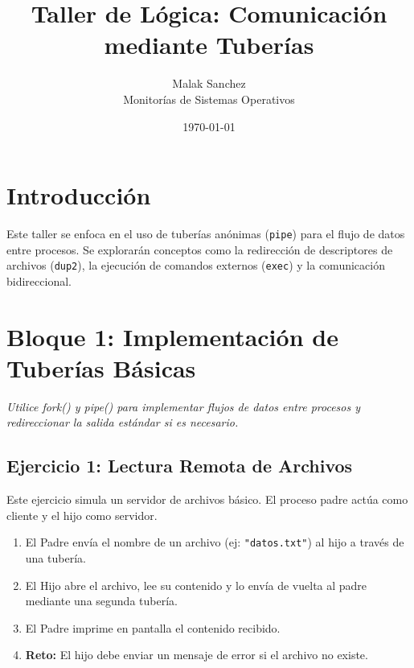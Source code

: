 \documentclass[12pt,a4paper]{article}
\title{\textbf{Taller de Lógica: Comunicación mediante Tuberías}}
\author{Malak Sanchez \\ \small Monitorías de Sistemas Operativos}
\date{\today}
\begin{document}
\maketitle

\section*{Introducción}
Este taller se enfoca en el uso de tuberías anónimas (\texttt{pipe}) para el flujo de datos entre procesos. Se explorarán conceptos como la redirección de descriptores de archivos (\texttt{dup2}), la ejecución de comandos externos (\texttt{exec}) y la comunicación bidireccional.

\section*{Bloque 1: Implementación de Tuberías Básicas}
\textit{Utilice fork() y pipe() para implementar flujos de datos entre procesos y redireccionar la salida estándar si es necesario.}

\subsection*{Ejercicio 1: Lectura Remota de Archivos}
Este ejercicio simula un servidor de archivos básico. El proceso padre actúa como cliente y el hijo como servidor.
\begin{enumerate}
    \item El Padre envía el nombre de un archivo (ej: \texttt{"datos.txt"}) al hijo a través de una tubería.
    \item El Hijo abre el archivo, lee su contenido y lo envía de vuelta al padre mediante una segunda tubería.
    \item El Padre imprime en pantalla el contenido recibido.
    \item \textbf{Reto:} El hijo debe enviar un mensaje de error si el archivo no existe.
\end{enumerate}

\begin{center}
\end{center}
\end{document}
